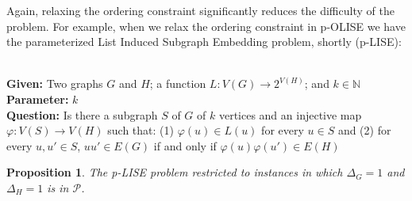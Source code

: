 \documentclass[11pt]{article}
\newtheorem{proposition}[theorem]{Proposition}
\newcommand{\paramproblem}[4]{\noindent {\sc #1}
\\
{\bf Given:} #2\\
{\bf Parameter:} #3\\
{\bf Question:} #4}
\newcommand{\nat}{\mathbb{N}}
\newcommand{\Pol}{\mbox{$\mathcal P$}}
\let\phi=\varphi
\begin{document}
Again, relaxing the ordering constraint significantly reduces the difficulty of the problem.  For example, when we relax the ordering constraint in p-OLISE we have the parameterized {\sc List Induced Subgraph Embedding} problem, shortly (p-LISE):

\paramproblem{} {Two graphs $G$ and $H$; a function $L : V(G) \longrightarrow 2^{V(H)}$; and $k \in \nat$}{$k$}{Is there a subgraph $S$ of $G$ of $k$ vertices and an injective map $\phi: V(S) \longrightarrow V(H)$ such that: (1) $\phi(u) \in L(u)$ for every $u \in S$ and (2) for every $u, u' \in S$, $uu' \in E(G)$ if and only if $\phi(u)\phi(u') \in E(H)$} \\


\begin{proposition}\label{prop:unordered_is_in_P}
The p-LISE problem restricted to instances in which $\Delta_G=1$ and $\Delta_H=1$ is in $\Pol$.
\end{proposition}
\end{document}
